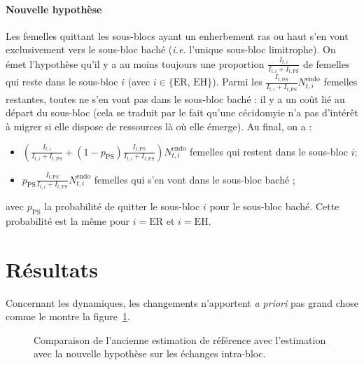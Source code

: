 \documentclass[a4paper, 11pt]{article}
\begin{document}
\paragraph{Nouvelle hypothèse} Les femelles quittant les sous-blocs ayant un enherbement ras ou haut s'en vont exclusivement vers le sous-bloc baché (\textit{i.e.} l'unique sous-bloc limitrophe).
On émet l'hypothèse qu'il y a au moins toujours une proportion $\frac{I_{t, i}}{I_{t, i} + I_{t, \text{PS}}}$ de femelles qui reste dans le sous-bloc $i$ (avec $i \in \{\text{ER, EH}\}$). Parmi les $\frac{I_{t, \text{PS}}}{I_{t, i} + I_{t, \text{PS}}} N^{\text{endo}}_{t, i}$ femelles restantes, toutes ne s'en vont pas dans le sous-bloc baché : il y a un coût lié au départ du sous-bloc (cela se traduit par le fait qu'une cécidomyie n'a pas d'intérêt à migrer si elle dispose de ressources là où elle émerge). Au final, on a :
\begin{itemize}
 \item $\left(\frac{I_{t, i}}{I_{t, i} + I_{t, \text{PS}}} + (1-p_{\text{PS}})\frac{I_{t, \text{PS}}}{I_{t, i} + I_{t, \text{PS}}}\right) N^{\text{endo}}_{t, i}$ femelles qui restent dans le sous-bloc $i$;
 \item $p_{\text{PS}}\frac{I_{t, \text{PS}}}{I_{t, i} + I_{t, \text{PS}}} N^{\text{endo}}_{t, i}$ femelles qui s'en vont dans le sous-bloc baché ;
\end{itemize}
avec $p_{\text{PS}}$ la probabilité de quitter le sous-bloc $i$ pour le sous-bloc baché. Cette probabilité est la même pour $i = \text{ER}$ et $i = \text{EH}$.

\section{Résultats}

Concernant les dynamiques, les changements n'apportent \textit{a priori} pas grand chose comme le montre la figure~\ref{fig:comp}.

\begin{figure}[ht]
 \centering
 \caption{Comparaison de l'ancienne estimation de référence avec l'estimation avec la nouvelle hypothèse sur les échanges intra-bloc.}
 \label{fig:comp}
\end{figure}
\end{document}
